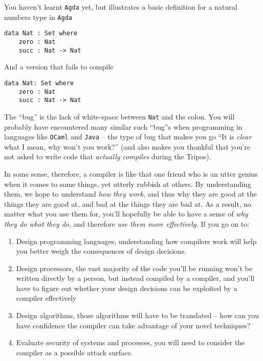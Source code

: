 You haven't learnt \texttt{Agda} yet, but  illustrates a basic definition for a natural numbers type in \texttt{Agda} 

\begin{code}
\label{code:agda-nat-good}
\begin{verbatim}
data Nat : Set where
    zero : Nat
    succ : Nat -> Nat
\end{verbatim}
\end{code}

And   a version that fails to compile 

\begin{code}
\label{code:agda-nat-bad}
\begin{verbatim}
data Nat: Set where
    zero : Nat
    succ : Nat -> Nat
\end{verbatim}
\end{code}

The ``bug'' is the lack of white-space between \texttt{Nat} and the colon. You will probably have encountered many similar such ``bug''s when programming in languages like \texttt{OCaml} and \texttt{Java} -- the type of bug that makes you go ``It is \emph{clear} what I mean, why won't you work?'' (and also makes you thankful that you're not asked to write code that \emph{actually compiles} during the Tripos).

In some sense, therefore, a compiler is like that one friend who is an utter genius when it comes to some things, yet utterly rubbish at others. By understanding them, we hope to understand \emph{how they work}, and thus why they are good at the things they are good at, and bad at the things they are bad at. As a result, no matter what you use them for, you'll hopefully be able to have a sense of \emph{why they do what they do}, and therefore \emph{use them more effectively}. If you go on to:

\begin{enumerate}
    \item Design programming languages, understanding how compilers work will help you better weigh the consequences of design decisions. 
    \item Design processors, the vast majority of the code you'll be running won't be written directly by a person, but instead compiled by a compiler, and you'll have to figure out whether your design decisions can be exploited by a compiler effectively
    \item Design algorithms, those algorithms will have to be translated -- how can you have confidence the compiler can take advantage of your novel techniques?
    \item Evaluate security of systems and processes, you will need to consider the compiler as a possible attack surface.
\end{enumerate}

